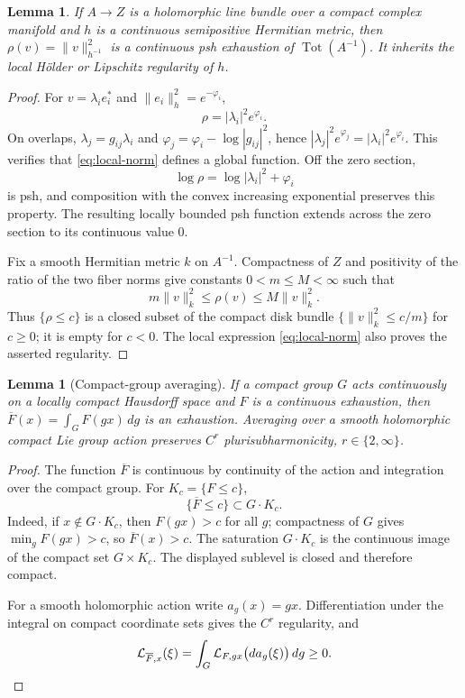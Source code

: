 \documentclass[11pt]{amsart}
\newtheorem{lemma}[theorem]{Lemma}
\theoremstyle{definition}
\theoremstyle{remark}
\numberwithin{equation}{section}
\newcommand{\Tot}{\operatorname{Tot}}
\newcommand{\Levi}{\mathcal L}
\begin{document}
\begin{lemma}\label{lem:norm}
If $A\to Z$ is a holomorphic line bundle over a compact complex
manifold and $h$ is a continuous semipositive Hermitian metric, then
$\rho(v)=\|v\|_{h^{-1}}^2$ is a continuous psh exhaustion of
$\Tot(A^{-1})$. It inherits the local H\"older or Lipschitz
regularity of $h$.
\end{lemma}
\begin{proof}
For $v=\lambda_i e_i^*$ and $\|e_i\|_h^2=e^{-\varphi_i}$,
\begin{equation}\label{eq:local-norm}
 \rho=|\lambda_i|^2e^{\varphi_i}.
\end{equation}
On overlaps, $\lambda_j=g_{ij}\lambda_i$ and
$\varphi_j=\varphi_i-\log|g_{ij}|^2$, hence
$|\lambda_j|^2e^{\varphi_j}=|\lambda_i|^2e^{\varphi_i}$.
This verifies that \eqref{eq:local-norm} defines a global function.
Off the zero section,
\[
 \log\rho=\log|\lambda_i|^2+\varphi_i
\]
is psh, and composition with the convex increasing exponential
preserves this property. The resulting locally bounded psh function
extends across the zero section to its continuous value $0$.

Fix a smooth Hermitian metric $k$ on $A^{-1}$. Compactness of $Z$
and positivity of the ratio of the two fiber norms give constants
$0<m\le M<\infty$ such that
\[
 m\|v\|_k^2\le\rho(v)\le M\|v\|_k^2.
\]
Thus $\{\rho\le c\}$ is a closed subset of the compact disk
bundle $\{\|v\|_k^2\le c/m\}$ for $c\ge0$; it is empty
for $c<0$. The local expression \eqref{eq:local-norm} also proves
the asserted regularity.
\end{proof}

\begin{lemma}[Compact-group averaging]\label{lem:average}
If a compact group $G$ acts continuously on a locally compact
Hausdorff space and $F$ is a continuous exhaustion, then
$\overline F(x)=\int_GF(gx)\,dg$ is an exhaustion.
Averaging over a smooth holomorphic compact Lie group action
preserves $C^r$ plurisubharmonicity, $r\in\{2,\infty\}$.
\end{lemma}
\begin{proof}
The function $\overline F$ is continuous by continuity of the
action and integration over the compact group. For
$K_c=\{F\le c\}$,
\[
 \{\overline F\le c\}\subset G\cdot K_c.
\]
Indeed, if $x\notin G\cdot K_c$, then $F(gx)>c$ for all $g$;
compactness of $G$ gives $\min_gF(gx)>c$, so
$\overline F(x)>c$. The saturation $G\cdot K_c$ is the continuous
image of the compact set $G\times K_c$. The displayed sublevel is
closed and therefore compact.

For a smooth holomorphic action write $a_g(x)=gx$.
Differentiation under the integral on compact coordinate sets gives
the $C^r$ regularity, and
\[
 \Levi_{\overline F,x}(\xi)
 =\int_G\Levi_{F,gx}\bigl(d a_g(\xi)\bigr)\,dg\ge0.\qedhere
\]
\end{proof}
\end{document}
